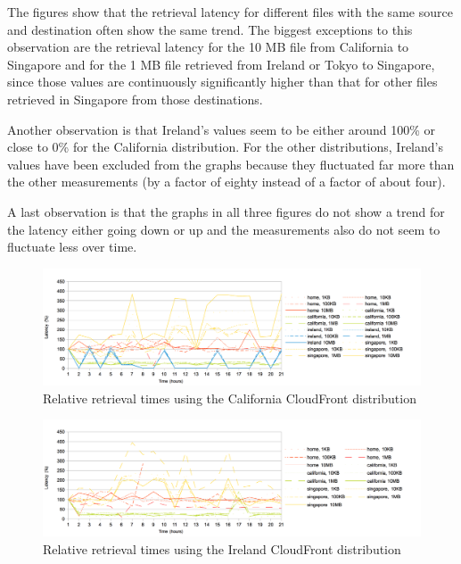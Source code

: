 \documentclass[conference]{IEEEtran}
\begin{document}
The figures show that the retrieval latency for different files with the same source and destination often show the same trend. The biggest exceptions to this observation are the retrieval latency for the 10 MB file from California to Singapore and for the 1 MB file retrieved from Ireland or Tokyo to Singapore, since those values are continuously significantly higher than that for other files retrieved in Singapore from those destinations.

Another observation is that Ireland's values seem to be either around 100\% or close to 0\% for the California distribution. For the other distributions, Ireland's values have been excluded from the graphs because they fluctuated far more than the other measurements (by a factor of eighty instead of a factor of about four).

A last observation is that the graphs in all three figures do not show a trend for the latency either going down or up and the measurements also do not seem to fluctuate less over time.


\begin{figure}[]
    \centering
    \includegraphics[width=6in]{images/california_relative.png}
    \caption[]{Relative retrieval times using the California CloudFront distribution}
    \label{fig:california_relative}
\end{figure}

\begin{figure}[]
    \centering
    \includegraphics[width=6in]{images/ireland_relative.png}
    \caption[]{Relative retrieval times using the Ireland CloudFront distribution}
    \label{fig:ireland_relative}
\end{figure}
\end{document}
